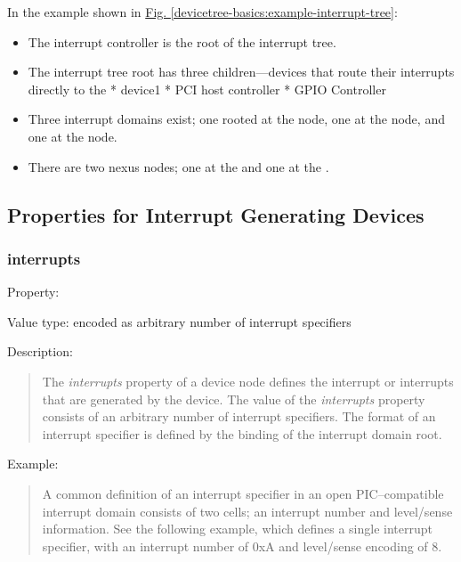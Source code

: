 \documentclass[a4paper,10pt,oneside]{sphinxmanual}
\begin{document}
In the example shown in \hyperref[devicetree-basics:example-interrupt-tree]{Fig. \ref{devicetree-basics:example-interrupt-tree}}:
\begin{itemize}
\item {} 
The  interrupt controller is the root of the interrupt tree.

\item {} 
The interrupt tree root has three children—devices that route their
interrupts directly to the 
* device1
* PCI host controller
* GPIO Controller

\item {} 
Three interrupt domains exist; one rooted at the  node,
one at the  node, and one at the
 node.

\item {} 
There are two nexus nodes; one at the  and one at
the .

\end{itemize}


\subsection{Properties for Interrupt Generating Devices}
\label{devicetree-basics:properties-for-interrupt-generating-devices}

\subsubsection{interrupts}
\label{devicetree-basics:interrupts}
Property: 

Value type:  encoded as arbitrary number of
interrupt specifiers

Description:
\begin{quote}

The \emph{interrupts} property of a device node defines the interrupt or
interrupts that are generated by the device. The value of the
\emph{interrupts} property consists of an arbitrary number of interrupt
specifiers. The format of an interrupt specifier is defined by the
binding of the interrupt domain root.
\end{quote}

Example:
\begin{quote}

A common definition of an interrupt specifier in an open PIC–compatible
interrupt domain consists of two cells; an interrupt number and
level/sense information. See the following example, which defines a
single interrupt specifier, with an interrupt number of 0xA and
level/sense encoding of 8.
\begin{quote}

\end{quote}
\end{quote}
\end{document}

